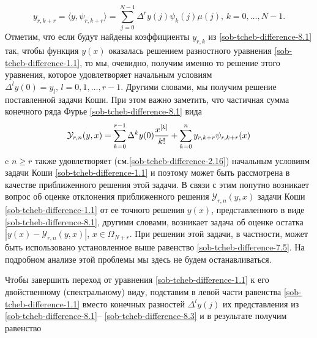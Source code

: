 \begin{equation}\label{sob-tcheb-difference-8.4}
y_{r,k+r}= \langle y,\psi_{r,k+r} \rangle =
\sum_{j=0}^{N-1}\Delta^ry(j)\psi_{k}(j)\mu(j),\, k=0,\ldots, N-1.
\end{equation}
Отметим, что если будут найдены коэффициенты $y_{r,k}$ из  \eqref{sob-tcheb-difference-8.1}  так, чтобы функция $y(x)$ оказалась решением разностного уравнения \eqref{sob-tcheb-difference-1.1}, то мы, очевидно, получим именно то решение этого уравнения, которое удовлетворяет начальным условиям $\Delta^{l}y(0)=y_l, \, l=0,1,\ldots,r-1$. Другими словами, мы получим решение поставленной задачи Коши. При этом важно заметить, что частичная сумма конечного ряда   Фурье \eqref{sob-tcheb-difference-8.1} вида
\begin{equation}\label{sob-tcheb-difference-8.5}
 \mathcal{Y}_{r,n}(y,x)= \sum_{k=0}^{r-1}\Delta^ky(0){x^{[k]}\over k!} +\sum_{k=0}^ny_{r,k+r} \psi_{r,k+r}(x)
  \end{equation}
c $n\ge r$ также удовлетворяет (см.\eqref{sob-tcheb-difference-2.16}) начальным условиям задачи Коши \eqref{sob-tcheb-difference-1.1} и поэтому может быть рассмотрена в качестве приближенного решения этой задачи. В связи с этим попутно возникает вопрос об оценке отклонения приближенного решения $\mathcal{Y}_{r,n}(y,x)$ задачи Коши \eqref{sob-tcheb-difference-1.1} от ее точного решения $y(x)$, представленного в виде \eqref{sob-tcheb-difference-8.1}, другими словами, возникает задача об оценке остатка $|y(x)-\mathcal{Y}_{r,n}(y,x)|$, $x \in \Omega_{N+r}$. При решении этой задачи, в частности, может быть использовано установленное выше равенство \eqref{sob-tcheb-difference-7.5}. На подробном анализе этой проблемы мы здесь не будем останавливаться.

Чтобы завершить переход от уравнения  \eqref{sob-tcheb-difference-1.1} к его двойственному (спектральному) виду,
подставим в левой части равенства \eqref{sob-tcheb-difference-1.1} вместо конечных разностей $\Delta^l y(j)$
их представления из \eqref{sob-tcheb-difference-8.1}-- \eqref{sob-tcheb-difference-8.3} и в результате получим равенство

